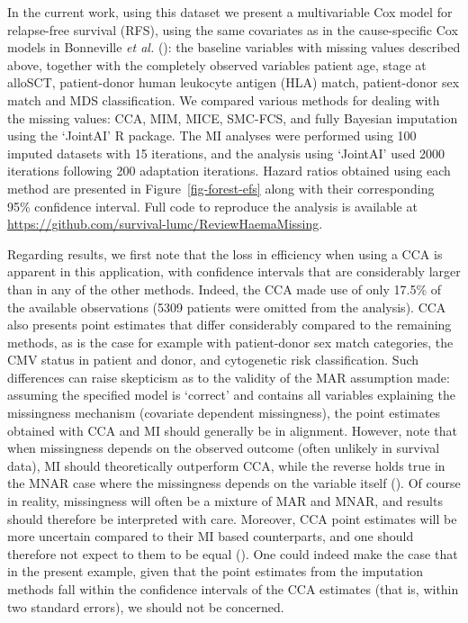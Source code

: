 \documentclass[
  letterpaper,
  paper=240mm:170mm,
  twoside=true,
  open=right,
  fontsize=10pt,
  pagesize=false,
  BCOR=15mm,
  DIV=14,
  headinclude=true,
  footinclude=false,
  headsepline=on]{scrbook}
\begin{document}
\endgroup{}

In the current work, using this dataset we present a multivariable Cox
model for relapse-free survival (RFS), using the same covariates as in
the cause-specific Cox models in Bonneville \emph{et al.}
():
the baseline variables with missing values described above, together
with the completely observed variables patient age, stage at alloSCT,
patient-donor human leukocyte antigen (HLA) match, patient-donor sex
match and MDS classification. We compared various methods for dealing
with the missing values: CCA, MIM, MICE, SMC-FCS, and fully Bayesian
imputation using the `JointAI' R package. The MI analyses were performed
using 100 imputed datasets with 15 iterations, and the analysis using
`JointAI' used 2000 iterations following 200 adaptation iterations.
Hazard ratios obtained using each method are presented in
Figure~\ref{fig-forest-efs} along with their corresponding 95\%
confidence interval. Full code to reproduce the analysis is available at
\url{https://github.com/survival-lumc/ReviewHaemaMissing}.

Regarding results, we first note that the loss in efficiency when using
a CCA is apparent in this application, with confidence intervals that
are considerably larger than in any of the other methods. Indeed, the
CCA made use of only 17.5\% of the available observations (5309 patients
were omitted from the analysis). CCA also presents point estimates that
differ considerably compared to the remaining methods, as is the case
for example with patient-donor sex match categories, the CMV status in
patient and donor, and cytogenetic risk classification. Such differences
can raise skepticism as to the validity of the MAR assumption made:
assuming the specified model is `correct' and contains all variables
explaining the missingness mechanism (covariate dependent missingness),
the point estimates obtained with CCA and MI should generally be in
alignment. However, note that when missingness depends on the observed
outcome (often unlikely in survival data), MI should theoretically
outperform CCA, while the reverse holds true in the MNAR case where the
missingness depends on the variable itself
(). Of course in reality, missingness will often be a mixture of MAR
and MNAR, and results should therefore be interpreted with care.
Moreover, CCA point estimates will be more uncertain compared to their
MI based counterparts, and one should therefore not expect to them to be
equal (). One could indeed make the case that in the present example,
given that the point estimates from the imputation methods fall within
the confidence intervals of the CCA estimates (that is, within two
standard errors), we should not be concerned.
\end{document}
